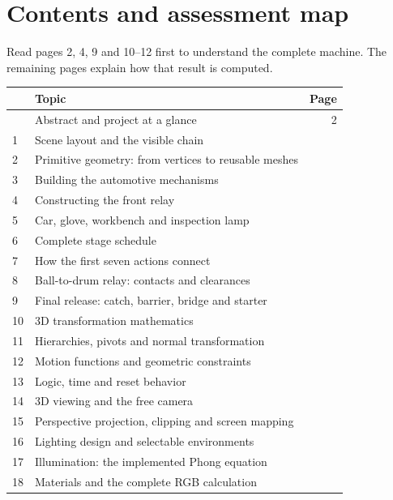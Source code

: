 \documentclass[a4paper,10pt]{article}
\newcommand{\lead}[1]{{\sffamily\color{muted}\normalsize #1\par}\vspace{3pt}}
\numberwithin{equation}{section}
\begin{document}
\newpage
\section*{Contents and assessment map}
\lead{Read pages 2, 4, 9 and 10--12 first to understand the complete machine. The remaining pages explain how that result is computed.}
\par\noindent\begin{tabularx}{\linewidth}{@{}p{10mm}Y r@{}}
\toprule
 & \textbf{Topic} & \textbf{Page}\\\midrule
 & Abstract and project at a glance & 2\\
1 & Scene layout and the visible chain & \pageref{section:1}\\
2 & Primitive geometry: from vertices to reusable meshes & \pageref{section:2}\\
3 & Building the automotive mechanisms & \pageref{section:3}\\
4 & Constructing the front relay & \pageref{section:4}\\
5 & Car, glove, workbench and inspection lamp & \pageref{section:5}\\
6 & Complete stage schedule & \pageref{section:6}\\
7 & How the first seven actions connect & \pageref{section:7}\\
8 & Ball-to-drum relay: contacts and clearances & \pageref{section:8}\\
9 & Final release: catch, barrier, bridge and starter & \pageref{section:9}\\
10 & 3D transformation mathematics & \pageref{section:10}\\
11 & Hierarchies, pivots and normal transformation & \pageref{section:11}\\
12 & Motion functions and geometric constraints & \pageref{section:12}\\
13 & Logic, time and reset behavior & \pageref{section:13}\\
14 & 3D viewing and the free camera & \pageref{section:14}\\
15 & Perspective projection, clipping and screen mapping & \pageref{section:15}\\
16 & Lighting design and selectable environments & \pageref{section:16}\\
17 & Illumination: the implemented Phong equation & \pageref{section:17}\\
18 & Materials and the complete RGB calculation & \pageref{section:18}\\

\end{tabularx}
\end{document}

